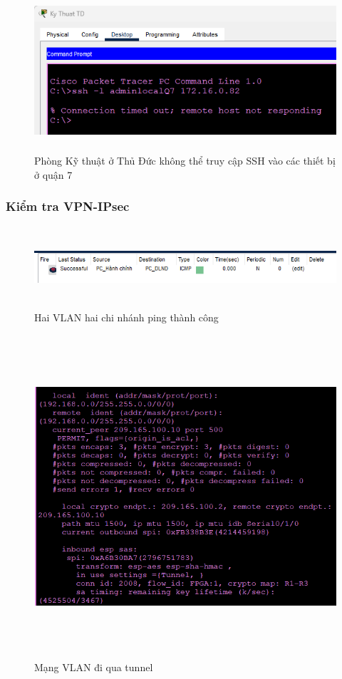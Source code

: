 \documentclass[a4paper, 12pt]{article}
\begin{document}
\begin{figure}[H]
    \centering
    \includegraphics[width=16cm, height=6cm]{img/ssh4.png}
    \caption{Phòng Kỹ thuật ở Thủ Đức không thể truy cập SSH vào các thiết bị ở quận 7}
    \label{ssh4}
\end{figure}
\subsubsection{Kiểm tra VPN-IPsec}
\begin{figure}[H]
    \centering
    \includegraphics[width=16cm, height=3cm]{img/vpn1.png}
    \caption{Hai VLAN hai chi nhánh ping thành công}
    \label{vpn1}
\end{figure}
\begin{figure}[H]
    \centering
    \includegraphics[width=16cm, height=12cm]{img/vpn2.png}
    \caption{Mạng VLAN đi qua tunnel}
    \label{vpn2}
\end{figure}
\end{document}
